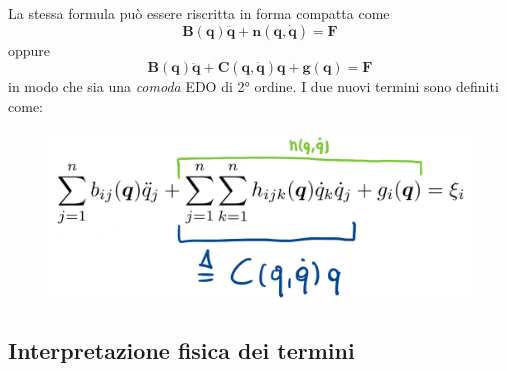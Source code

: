 La stessa formula può essere riscritta in forma compatta come
\begin{equation}\label{eq:robot_dynamics_short}
\boxed{
	\bm{B}(\bm{q})\bm{\ddot{q}} + \bm{n}(\bm{q}, \bm{\dot{q}}) = \mathcal{\bm{F}}
}
\end{equation}
oppure
\begin{equation}\label{eq:robot_dynamics_short2}
\boxed{
	\bm{B}(\bm{q})\bm{\ddot{q}} + \bm{C}(\bm{q}, \bm{\dot{q}})\bm{q} + \bm{g}(\bm{q})= \mathcal{\bm{F}}
}
\end{equation}
in modo che sia una \textit{comoda} EDO di 2° ordine. I due nuovi termini sono definiti come:
\begin{figure}[H]
	\centering
	\includegraphics[width=0.5\linewidth]{images/dynamics_2}
	\label{fig:dynamics2}
\end{figure}





\subsection{Interpretazione fisica dei termini}

